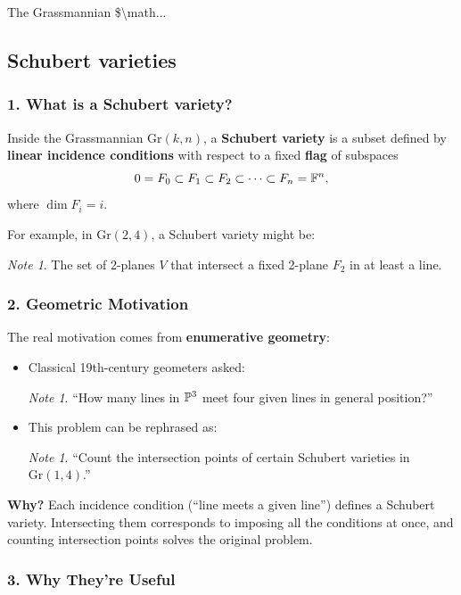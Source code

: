 \documentclass{amsart}
\let\originalmathbb\mathbb
\renewcommand{\mathbb}[1]{%
    \ifstrequal{#1}{1}{\mathbbm{#1}}{\originalmathbb{#1}}%
}
\theoremstyle{plain}
\theoremstyle{definition}
\theoremstyle{remark}
\newtheorem{note}[theorem]{Note}
\begin{document}
The Grassmannian \$\textbackslash{}math...

\subsection{Schubert varieties}

\subsubsection{1. \textbf{What is a Schubert variety?}}

Inside the Grassmannian $\mathrm{Gr}(k,n)$, a \textbf{Schubert variety} is a subset defined by \textbf{linear incidence conditions} with respect to a fixed \textbf{flag} of subspaces
\[
0 = F_0 \subset F_1 \subset F_2 \subset \cdots \subset F_n = \mathbb{F}^n,
\]
where $\dim F_i = i$.

For example, in $\mathrm{Gr}(2,4)$, a Schubert variety might be:

\begin{note}
The set of 2-planes $V$ that intersect a fixed 2-plane $F_2$ in at least a line.
\end{note}
\subsubsection{2. \textbf{Geometric Motivation}}

The real motivation comes from \textbf{enumerative geometry}:

\begin{itemize}
	\item Classical 19th-century geometers asked:
\begin{note}
“How many lines in $\mathbb{P}^3$ meet four given lines in general position?”
\end{note}	\item This problem can be rephrased as:
\begin{note}
“Count the intersection points of certain Schubert varieties in $\mathrm{Gr}(1,4)$.”
\end{note}\end{itemize}

\textbf{Why?}
Each incidence condition (“line meets a given line”) defines a Schubert variety. Intersecting them corresponds to imposing all the conditions at once, and counting intersection points solves the original problem.

\subsubsection{3. \textbf{Why They’re Useful}}
\end{document}
